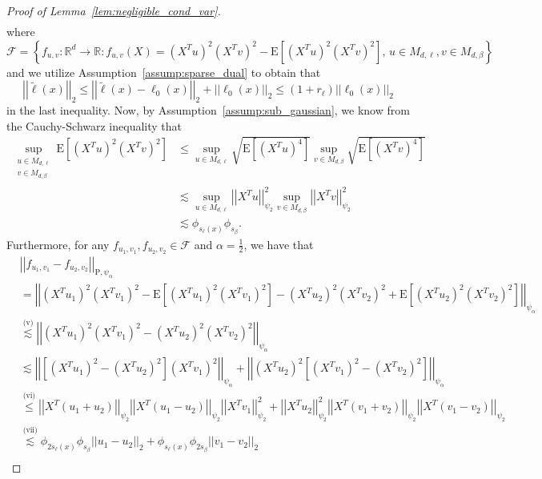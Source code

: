 \documentclass[ejsv2,noshowframe]{imsart}
\theoremstyle{plain}
\theoremstyle{definition}
\theoremstyle{remark}
\newcommand{\norm}[1]{\left|\left| #1 \right|\right|}
\renewcommand{\tilde}{\widetilde}
\begin{document}
\begin{proof}[Proof of Lemma~\ref{lem:negligible_cond_var}]
\begin{align*}
	\end{align*}
	where
	$$\mathcal{F}=\left\{f_{u,v}: \mathbb{R}^d \to \mathbb{R}: f_{u,v}(X) = \left(X^Tu\right)^2 \left(X^Tv\right)^2 - \mathrm{E}\left[\left(X^Tu\right)^2 \left(X^Tv\right)^2 \right],\, u\in M_{d,\ell}, v\in M_{d,\beta}\right\}$$
	and we utilize Assumption~\ref{assump:sparse_dual} to obtain that
	$$\norm{\tilde{\ell}(x)}_2 \leq \norm{\tilde{\ell}(x)-\ell_0(x)}_2 + \norm{\ell_0(x)}_2 \leq (1+r_{\ell}) \norm{\ell_0(x)}_2$$
	in the last inequality. Now, by Assumption~\ref{assump:sub_gaussian}, we know from the Cauchy-Schwarz inequality that
	\begin{align*}
		\sup_{\substack{u\in M_{d,\ell}\\v\in M_{d,\beta}}}\mathrm{E}\left[(X^Tu)^2 (X^Tv)^2\right] & \leq \sup_{u\in M_{d,\ell}} \sqrt{\mathrm{E}\left[(X^Tu)^4\right]}  \sup_{v\in M_{d,\beta}} \sqrt{\mathrm{E}\left[(X^Tv)^4\right]}\\
		&\lesssim \sup_{u\in M_{d,\ell}}\norm{X^Tu}_{\psi_2}^2 \sup_{v\in M_{d,\beta}}\norm{X^Tv}_{\psi_2}^2\\
		&\lesssim \phi_{s_{\ell}(x)}  \phi_{s_{\beta}}.
	\end{align*}
	Furthermore, for any $f_{u_1,v_1},f_{u_2,v_2} \in \mathcal{F}$ and $\alpha=\frac{1}{2}$, we have that 
	\begin{align*}
		&\norm{f_{u_1,v_1} - f_{u_2,v_2}}_{\mathrm{P},\psi_{\alpha}} \\
		&= \norm{\left(X^Tu_1\right)^2 \left(X^Tv_1\right)^2 - \mathrm{E}\left[\left(X^Tu_1\right)^2 \left(X^Tv_1\right)^2 \right] - \left(X^Tu_2\right)^2 \left(X^Tv_2\right)^2 + \mathrm{E}\left[\left(X^Tu_2\right)^2 \left(X^Tv_2\right)^2 \right]}_{\psi_{\alpha}}\\
		&\stackrel{\text{(v)}}{\lesssim} \norm{\left(X^Tu_1\right)^2 \left(X^Tv_1\right)^2 - \left(X^Tu_2\right)^2 \left(X^Tv_2\right)^2}_{\psi_{\alpha}} \\
		&\lesssim \norm{\left[\left(X^Tu_1\right)^2 - \left(X^Tu_2\right)^2 \right] \left(X^Tv_1\right)^2}_{\psi_{\alpha}} + \norm{\left(X^Tu_2\right)^2\left[\left(X^Tv_1\right)^2 - \left(X^Tv_2\right)^2\right]}_{\psi_{\alpha}}\\
		&\stackrel{\text{(vi)}}{\leq} \norm{X^T(u_1+u_2)}_{\psi_2} \norm{X^T(u_1-u_2)}_{\psi_2} \norm{X^Tv_1}_{\psi_2}^2 + \norm{X^Tu_2}_{\psi_2}^2 \norm{X^T(v_1+v_2)}_{\psi_2} \norm{X^T(v_1-v_2)}_{\psi_2}\\
		&\stackrel{\text{(vii)}}{\lesssim} \phi_{2s_{\ell}(x)} \phi_{s_{\beta}} \norm{u_1-u_2}_2 + \phi_{s_{\ell}(x)} \phi_{2s_{\beta}} \norm{v_1-v_2}_2\\

\end{align*}
\end{proof}
\end{document}
